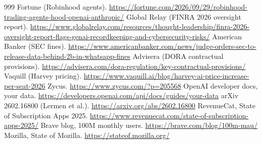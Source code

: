 \documentclass[10pt,a4paper]{article}
\begin{document}
\begin{thebibliography}{999}
 Fortune (Robinhood agents). \url{https://fortune.com/2026/09/29/robinhood-trading-agents-hood-openai-anthropic/}
 Global Relay (FINRA 2026 oversight report). \url{https://www.globalrelay.com/resources/thought-leadership/finra-2026-oversight-report-flags-genai-recordkeeping-and-cybersecurity-risks/}
 American Banker (SEC fines). \url{https://www.americanbanker.com/news/judge-orders-sec-to-release-data-behind-2b-in-whatsapp-fines}
 Advisera (DORA contractual provisions). \url{https://advisera.com/dora-regulation/key-contractual-provisions/}
 Vaquill (Harvey pricing). \url{https://www.vaquill.ai/blog/harvey-ai-price-increase-per-seat-2026}
 Zycus. \url{https://www.zycus.com/?p=205568}
 OpenAI developer docs, your data. \url{https://developers.openai.com/api/docs/guides/your-data}
 arXiv 2602.16800 (Lermen et al.). \url{https://arxiv.org/abs/2602.16800}
 RevenueCat, State of Subscription Apps 2025. \url{https://www.revenuecat.com/state-of-subscription-apps-2025/}
 Brave blog, 100M monthly users. \url{https://brave.com/blog/100m-mau/}
 Mozilla, State of Mozilla. \url{https://stateof.mozilla.org/}
\end{thebibliography}
\end{document}
